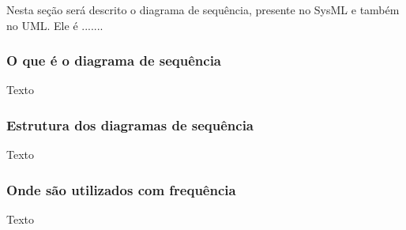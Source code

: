 Nesta seção será descrito o diagrama de sequência, presente no SysML e também no UML. Ele é .......


\subsubsection{O que é o diagrama de sequência}
Texto

\subsubsection{Estrutura dos diagramas de sequência}
Texto

\subsubsection{Onde são utilizados com frequência}
Texto